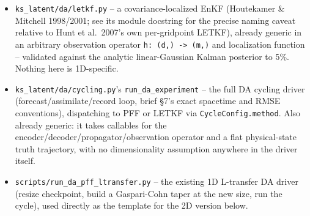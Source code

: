 \documentclass[11pt]{article}
\begin{document}
\begin{itemize}[leftmargin=*]
\item \texttt{ks\_latent/da/letkf.py} -- a covariance-localized EnKF
  (Houtekamer \& Mitchell 1998/2001; see its module docstring for the
  precise naming caveat relative to Hunt et al.\ 2007's own per-gridpoint
  LETKF), already generic in an arbitrary observation operator
  \texttt{h: (d,) -> (m,)} and localization function -- validated against
  the analytic linear-Gaussian Kalman posterior to 5\%. Nothing here is
  1D-specific.
\item \texttt{ks\_latent/da/cycling.py}'s \texttt{run\_da\_experiment} --
  the full DA cycling driver (forecast/assimilate/record loop, brief
  \S7's exact spacetime and RMSE conventions), dispatching to PFF or
  LETKF via \texttt{CycleConfig.method}. Also already generic: it takes
  callables for the encoder/decoder/propagator/observation operator and
  a flat physical-state truth trajectory, with no dimensionality
  assumption anywhere in the driver itself.
\item \texttt{scripts/run\_da\_pff\_ltransfer.py} -- the existing 1D
  L-transfer DA driver (resize checkpoint, build a Gaspari-Cohn taper at
  the new size, run the cycle), used directly as the template for the
  2D version below.
\end{itemize}
\end{document}
